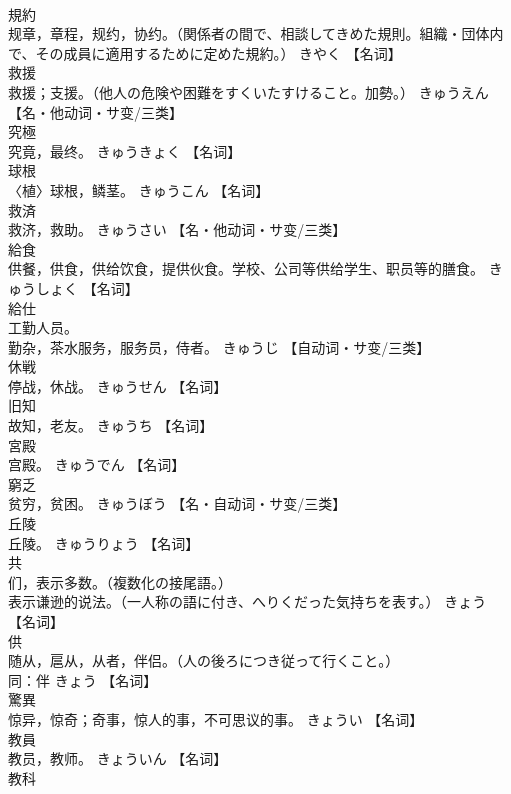 \documentclass[8pt]{extreport}
\begin{document}
\begin{CJK}{UTF8}{min}
\\	規約	
\\	规章，章程，规约，协约。（関係者の間で、相談してきめた規則。組織・団体内で、その成員に適用するために定めた規約。）	きやく		【名词】
\\	救援	
\\	救援；支援。（他人の危険や困難をすくいたすけること。加勢。）	きゅうえん		【名・他动词・サ变/三类】
\\	究極	
\\	究竟，最终。	きゅうきょく		【名词】
\\	球根	
\\	〈植〉球根，鳞茎。	きゅうこん		【名词】
\\	救済	
\\	救济，救助。	きゅうさい		【名・他动词・サ变/三类】
\\	給食	
\\	供餐，供食，供给饮食，提供伙食。学校、公司等供给学生、职员等的膳食。	きゅうしょく		【名词】
\\	給仕	
\\	工勤人员。 
\\	勤杂，茶水服务，服务员，侍者。	きゅうじ		【自动词・サ变/三类】
\\	休戦	
\\	停战，休战。	きゅうせん		【名词】
\\	旧知	
\\	故知，老友。	きゅうち		【名词】
\\	宮殿	
\\	宫殿。	きゅうでん		【名词】
\\	窮乏	
\\	贫穷，贫困。	きゅうぼう		【名・自动词・サ变/三类】
\\	丘陵	
\\	丘陵。	きゅうりょう		【名词】
\\	共	
\\	们，表示多数。（複数化の接尾語。） 
\\	表示谦逊的说法。（一人称の語に付き、へりくだった気持ちを表す。）	きょう		【名词】
\\	供	
\\	随从，扈从，从者，伴侣。（人の後ろにつき従って行くこと。） 
\\	同：伴	きょう		【名词】
\\	驚異	
\\	惊异，惊奇；奇事，惊人的事，不可思议的事。	きょうい		【名词】
\\	教員	
\\	教员，教师。	きょういん		【名词】
\\	教科	

\end{CJK}
\end{document}
